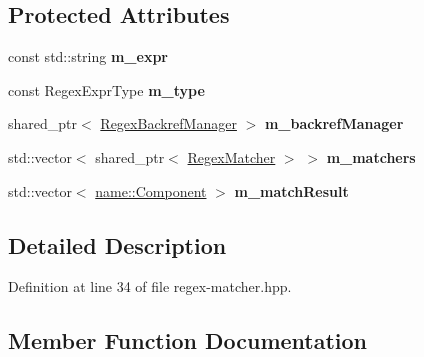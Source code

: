 \subsection*{Protected Attributes}
\begin{DoxyCompactItemize}
\item 
const std\+::string {\bfseries m\+\_\+expr}\hypertarget{classndn_1_1RegexMatcher_a9e65df4deaf21dddf49843ce03922658}{}\label{classndn_1_1RegexMatcher_a9e65df4deaf21dddf49843ce03922658}

\item 
const Regex\+Expr\+Type {\bfseries m\+\_\+type}\hypertarget{classndn_1_1RegexMatcher_aa18f5ed632d6f52ce7ac8b607ed9ee21}{}\label{classndn_1_1RegexMatcher_aa18f5ed632d6f52ce7ac8b607ed9ee21}

\item 
shared\+\_\+ptr$<$ \hyperlink{classndn_1_1RegexBackrefManager}{Regex\+Backref\+Manager} $>$ {\bfseries m\+\_\+backref\+Manager}\hypertarget{classndn_1_1RegexMatcher_a9498e3a63538384b9797051bab8f1416}{}\label{classndn_1_1RegexMatcher_a9498e3a63538384b9797051bab8f1416}

\item 
std\+::vector$<$ shared\+\_\+ptr$<$ \hyperlink{classndn_1_1RegexMatcher}{Regex\+Matcher} $>$ $>$ {\bfseries m\+\_\+matchers}\hypertarget{classndn_1_1RegexMatcher_ae13819b5a363ac123d9f814f5a9ff2fc}{}\label{classndn_1_1RegexMatcher_ae13819b5a363ac123d9f814f5a9ff2fc}

\item 
std\+::vector$<$ \hyperlink{classndn_1_1name_1_1Component}{name\+::\+Component} $>$ {\bfseries m\+\_\+match\+Result}\hypertarget{classndn_1_1RegexMatcher_a257f588d3d36d18b27a74f1ccf4cff55}{}\label{classndn_1_1RegexMatcher_a257f588d3d36d18b27a74f1ccf4cff55}

\end{DoxyCompactItemize}


\subsection{Detailed Description}


Definition at line 34 of file regex-\/matcher.\+hpp.



\subsection{Member Function Documentation}
